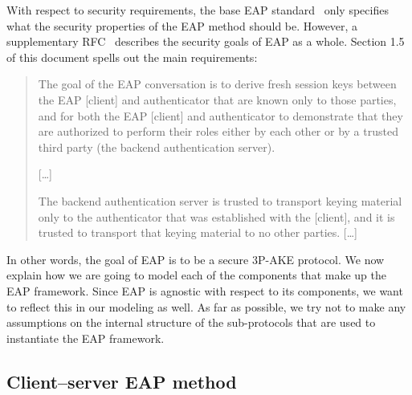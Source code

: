 With respect to security requirements,
the base EAP standard~\cite{IETF:RFC3748:EAP} only specifies what the security properties of the EAP method should be.
However,
a supplementary RFC~\cite{IETF:RFC5247:EAP-key-management} describes the security goals of EAP as a whole.  
Section 1.5 of this document spells out the main requirements:
\begin{quote}

	The goal of the EAP conversation is to derive fresh session keys
   between the EAP [client] and authenticator that are known only to those
   parties, and for both the EAP [client] and authenticator to demonstrate
   that they are authorized to perform their roles either by each other
   or by a trusted third party (the backend authentication server).
   
%  

	[\dots]
   
   The backend authentication server is trusted to transport keying
  material only to the authenticator that was established with the
  [client], and it is trusted to transport that keying material to no other
  parties. [\dots] 

\end{quote}

In other words,
the goal of EAP is to be a secure 3P-AKE protocol.
We now explain how we are going to model each of the components that make up the EAP framework.
Since EAP is agnostic with respect to its components,
we want to reflect this in our modeling as well.
As far as possible,
we try not to make any assumptions on the internal structure of the sub-protocols that are used to instantiate the EAP framework.


\subsection{Client--server EAP method}\label{sec:generic_composition_results:modeling_EAP:EAP_method}

